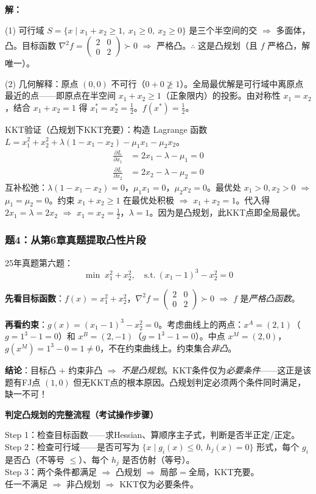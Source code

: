 \medskip
\textbf{解：}

(1) 可行域 $S = \{x \mid x_1+x_2 \ge 1,\ x_1 \ge 0,\ x_2 \ge 0\}$ 是三个半空间的交 $\Rightarrow$ 多面体，凸。目标函数 $\nabla^2 f = \begin{pmatrix}2&0\\0&2\end{pmatrix} \succ 0$ $\Rightarrow$ 严格凸。$\therefore$ 这是凸规划（且 $f$ 严格凸，解唯一）。

(2) 几何解释：原点 $(0,0)$ 不可行（$0+0\ngeq1$）。全局最优解是可行域中离原点最近的点——即原点在半空间 $x_1+x_2\ge1$（正象限内）的投影。由对称性 $x_1=x_2$，结合 $x_1+x_2=1$ 得 $x_1^*=x_2^*=\frac12$。$f(x^*)=\frac12$。

KKT验证（凸规划下KKT充要）：构造 Lagrange 函数 $L = x_1^2+x_2^2 + \lambda(1-x_1-x_2) - \mu_1 x_1 - \mu_2 x_2$。
\[
\begin{aligned}
\frac{\partial L}{\partial x_1} &= 2x_1 - \lambda - \mu_1 = 0 \\
\frac{\partial L}{\partial x_2} &= 2x_2 - \lambda - \mu_2 = 0
\end{aligned}
\]
互补松弛：$\lambda(1-x_1-x_2)=0$，$\mu_1 x_1=0$，$\mu_2 x_2=0$。最优处 $x_1>0,x_2>0$ $\Rightarrow$ $\mu_1=\mu_2=0$。约束 $x_1+x_2\ge1$ 在最优处积极 $\Rightarrow$ $x_1+x_2=1$。代入得 $2x_1=\lambda=2x_2$ $\Rightarrow$ $x_1=x_2=\frac12$，$\lambda=1$。因为是凸规划，此KKT点即全局最优。

\subsubsection{题4：从第6章真题提取凸性片段}

25年真题第六题：
\[
\min\; x_1^2 + x_2^2,\quad \text{s.t.}\ (x_1-1)^3 - x_2^2 = 0
\]

\textbf{先看目标函数}：$f(x)=x_1^2+x_2^2$，$\nabla^2 f = \begin{pmatrix}2&0\\0&2\end{pmatrix} \succ 0$ $\Rightarrow$ $f$ 是\emph{严格凸函数}。

\textbf{再看约束}：$g(x)=(x_1-1)^3-x_2^2=0$。考虑曲线上的两点：$x^A=(2,1)$（$g=1^3-1=0$）和 $x^B=(2,-1)$（$g=1^3-1=0$）。中点 $x^M=(2,0)$，$g(x^M)=1^3-0=1\neq0$，不在约束曲线上。约束集合\emph{非凸}。

\textbf{结论}：目标凸 $+$ 约束非凸 $\Rightarrow$ \emph{不是凸规划}。KKT条件仅为\emph{必要条件}——这正是该题有FJ点 $(1,0)$ 但无KKT点的根本原因。凸规划判定必须两个条件同时满足，缺一不可！

\begin{notebox}
\textbf{判定凸规划的完整流程（考试操作步骤）}

Step 1：检查目标函数——求Hessian、算顺序主子式，判断是否半正定/正定。\\
Step 2：检查可行域——是否可写为 $\{x\mid g_i(x)\le0,\ h_j(x)=0\}$ 形式，每个 $g_i$ 是否凸（不等号 $\le$）、每个 $h_j$ 是否仿射（等号）。\\
Step 3：两个条件都满足 $\Rightarrow$ 凸规划 $\Rightarrow$ 局部$=$全局，KKT充要。\\
\hspace{1.5em}任一不满足 $\Rightarrow$ 非凸规划 $\Rightarrow$ KKT仅为必要条件。
\end{notebox}


